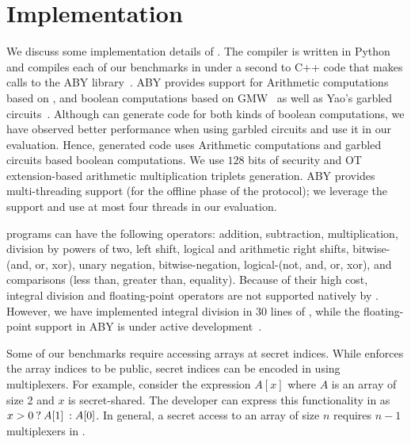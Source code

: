 \vspace{-0.1in}
\section{Implementation}
\label{sec:impl}
We discuss some  implementation details of \tool.
The  \tool compiler is written in Python and
compiles each of our benchmarks in under a second to C++ code that
makes calls to the ABY
library~\cite{aby}. 
ABY provides support for Arithmetic computations based on \cite{autoS}, and boolean computations based on GMW~\cite{gmw} as well as Yao's garbled circuits~\cite{yao}. Although \tool can generate code for both kinds of boolean computations, we have observed better performance when using  garbled circuits
and use it in our evaluation. Hence, \tool generated code uses Arithmetic computations and garbled circuits based boolean computations.
We use $128$ bits of security and OT
extension-based arithmetic multiplication triplets generation. ABY
provides multi-threading support (for the offline phase of the \mpc
protocol); we leverage the support and use at most four threads in our
evaluation. 

\tool programs can have the following operators:
addition, subtraction, multiplication, division by powers of two, left
shift,
logical and arithmetic right shifts, bitwise-(and, or, xor), unary
negation, 
bitwise-negation, logical-(not, and, or, xor), and comparisons (less
than, greater than, equality).  
Because of their high cost, integral division and floating-point
operators are not supported natively by \tool. 
However, we have implemented integral division in 30 lines of \tool,
while the floating-point support in ABY is under active
development~\cite{ddkssz15}.

Some of our benchmarks require accessing arrays at secret
indices. While \tool enforces the array indices to be
public, secret indices can be encoded in \tool using multiplexers.
For example, consider the expression $A[x]$ where $A$ is an array of
size 2 and $x$ is secret-shared. The developer can express
this functionality in \tool as ${{x > 0}\:?\:{A[1]}\::{A[0]}}$. In general,
a secret access to an array of
size $n$ requires ${n}-1$ multiplexers in \tool.


